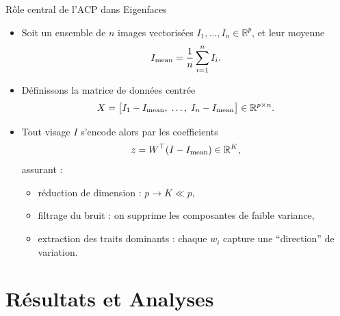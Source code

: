 \documentclass{beamer}
\begin{document}
\begin{frame}{Rôle central de l’ACP dans Eigenfaces}
\small
\begin{itemize}
  \item Soit un ensemble de $n$ images vectorisées $I_1,\dots,I_n\in\mathbb{R}^p$, et leur moyenne
    \[
      I_{\rm mean} = \frac1n\sum_{i=1}^n I_i.
    \]
  \item Définissons la matrice de données centrée
    \[
      X = \bigl[I_1 - I_{\rm mean},\;\dots,\;I_n - I_{\rm mean}\bigr]\in\mathbb{R}^{p\times n}.
    \]
  \item Tout visage $I$ s'encode alors par les coefficients
    \[
      z = W^{\top}(I - I_{\rm mean})\in\mathbb{R}^K,
    \]
    assurant :
    \begin{itemize}
      \item réduction de dimension : $p\to K\ll p$,
      \item filtrage du bruit : on supprime les composantes de faible variance,
      \item extraction des traits dominants : chaque $w_i$ capture une “direction” de variation.
    \end{itemize}
\end{itemize}
\end{frame}

\section{Résultats et Analyses}
\end{document}
